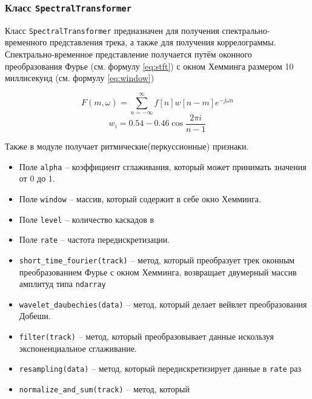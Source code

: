 \subsubsection{Класс \texttt{SpectralTransformer}}

Класс \texttt{SpectralTransformer} предназначен для получения спектрально-временного представления трека, а также для получения коррелограммы. Спектрально-временное представление получается путём оконного преобразования Фурье (см. формулу \ref{eq:stft}) с окном Хемминга размером 10 миллисекунд (см. формулу \ref{eq:window})

\begin{equation}\label{eq:stft}
F(m, \omega) = \sum \limits_{n=-\infty}^{\infty} f[n]w[n-m]e^{-j \omega n} 
\end{equation}
\begin{equation}\label{eq:window}
w_i = 0.54 - 0.46 \cos\frac{2\pi i}{n-1}
\end{equation}

Также в модуле получает ритмические(перкуссионные) признаки. 

\begin{itemize}
\item{Поле \texttt{alpha} -- коэффициент сглаживания, который может принимать значения от 0 до 1.}
\item{Поле \texttt{window} -- массив, который содержит в себе окно Хемминга.}
\item{Поле \texttt{level} -- количество каскадов в }
\item{Поле \texttt{rate} -- частота передискретизации.}
\item{\texttt{short\_time\_fourier(track)} -- метод, который преобразует трек оконным преобразованием Фурье с окном Хемминга, возвращает двумерный массив амплитуд типа \texttt{ndarray} }
\item{\texttt{wavelet\_daubechies(data)} -- метод, который  делает вейвлет преобразования Добеши. }
\item{\texttt{filter(track)} -- метод, который преобразовывает данные искользуя экспоненциальное сглаживание.}
\item{\texttt{resampling(data)} -- метод, который передискретизирует данные в \texttt{rate} раз }
\item{\texttt{normalize\_and\_sum(track)} -- метод, который}
\end{itemize}


